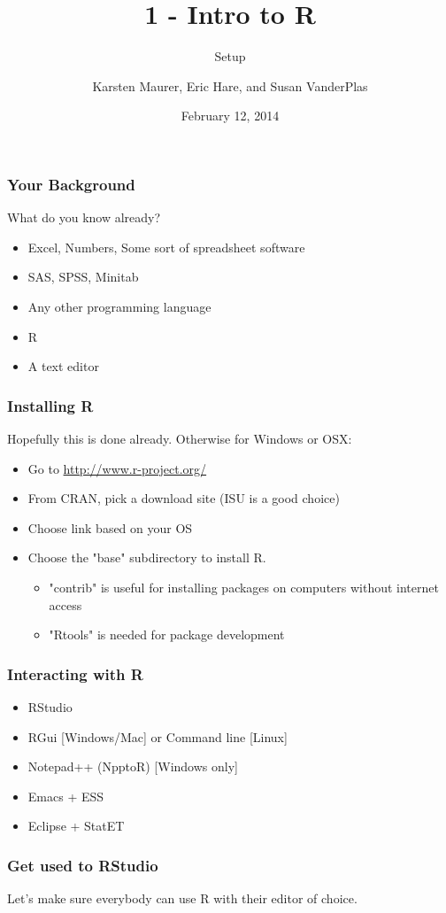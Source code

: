 \documentclass{beamer}\usepackage[]{graphicx}\usepackage[]{color}
\title[ 1-Intro]{1 - Intro to R}
\subtitle{Setup}
\author[ K. Maurer, S. VanderPlas, E. Hare]{Karsten Maurer, Eric Hare, and Susan VanderPlas}
\date{February 12, 2014}
\institute[ISU]{Iowa State University}
\begin{document}
\begin{frame}
    \maketitle
\end{frame}


\begin{frame}
    \frametitle{Your Background}
What do you know already?
    \begin{itemize}
        \item Excel, Numbers, Some sort of spreadsheet software \pause
        \item SAS, SPSS, Minitab \pause
        \item Any other programming language \pause
        \item R \pause
        \item A text editor
    \end{itemize}
\end{frame}

\begin{frame}
    \frametitle{Installing R}
    Hopefully this is done already.  Otherwise for Windows or OSX:
    \begin{itemize}
        \item Go to \url{http://www.r-project.org/}
        \item From CRAN, pick a download site (ISU is a good choice)
        \item Choose link based on your OS
        \item Choose the "base" subdirectory to install R.
        \begin{itemize}
            \item "contrib" is useful for installing packages on computers without internet access
            \item "Rtools" is needed for package development
        \end{itemize}
    \end{itemize}
\end{frame}

\begin{frame}
    \frametitle{Interacting with R}
    \begin{itemize}
        \item RStudio
        \item RGui [Windows/Mac] or Command line [Linux]
        \item Notepad++ (NpptoR) [Windows only]
        \item Emacs + ESS
        \item Eclipse + StatET
    \end{itemize}
\end{frame}

\begin{frame}
    \frametitle{Get used to RStudio}
\Large
Let's make sure everybody can use R with their editor of choice.
\end{frame}
\end{document}

